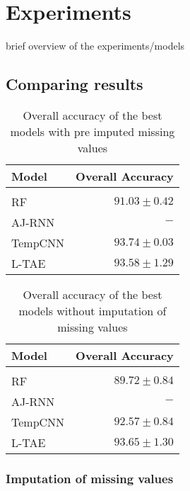 \chapter{Experiments}
brief overview of the experiments/models


\pagebreak

\pagebreak

\pagebreak

\pagebreak


\section{Comparing results}

\begin{table}[H]
  \centering
    \begin{tabular}{lr}
    Model                       & Overall Accuracy             \\[0.2cm] 
    \hline \\[-0.2cm]
    RF      & $91.03 \pm 0.42$\\
    AJ-RNN & $-$\\
    TempCNN & $93.74 \pm 0.03$\\
    L-TAE   & $93.58 \pm 1.29$
    \end{tabular}
  \caption{Overall accuracy of the best models with pre imputed missing values}
  \label{tab:ALLresultsImputed} 
\end{table}

\begin{table}[H]
  \centering
    \begin{tabular}{lr}
    Model                       & Overall Accuracy             \\[0.2cm] 
    \hline \\[-0.2cm]
    RF      & $89.72 \pm 0.84$\\
    AJ-RNN & $-$\\
    TempCNN & $92.57 \pm 0.84$\\
    L-TAE   & $93.65 \pm 1.30$
    \end{tabular}
  \caption{Overall accuracy of the best models without imputation of missing values} 
  \label{tab:ALLresultsNoImputed}
\end{table}

\subsection{Imputation of missing values}


